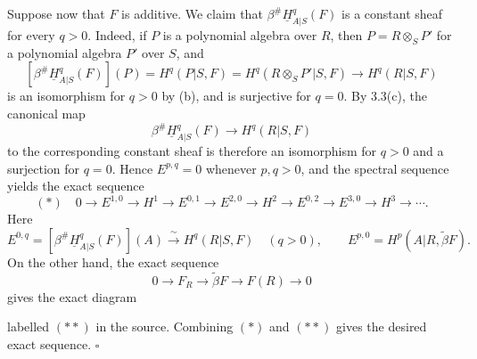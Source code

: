 Suppose now that $F$ is additive. We claim that
$\beta^{\#}\underline H^q_{A|S}(F)$ is a constant sheaf for every
$q>0$. Indeed, if $P$ is a polynomial algebra over $R$, then
$P=R\otimes_SP'$ for a polynomial algebra $P'$ over $S$, and
\[
 [\beta^{\#}\underline H^q_{A|S}(F)](P)
 =H^q(P|S,F)
 =H^q(R\otimes_SP'|S,F)
 \longrightarrow H^q(R|S,F)
\]
is an isomorphism for $q>0$ by (b), and is surjective for $q=0$.
By 3.3(c), the canonical map
\[
 \beta^{\#}\underline H^q_{A|S}(F)
 \longrightarrow H^q(R|S,F)
\]
to the corresponding constant sheaf is therefore an isomorphism
for $q>0$ and a surjection for $q=0$. Hence $E^{p,q}=0$ whenever
$p,q>0$, and the spectral sequence yields the exact sequence
\[
 (*)\quad
 0\longrightarrow E^{1,0}\longrightarrow H^1
 \longrightarrow E^{0,1}\longrightarrow E^{2,0}
 \longrightarrow H^2\longrightarrow E^{0,2}
 \longrightarrow E^{3,0}\longrightarrow H^3\longrightarrow\cdots.
\]
Here
\[
 E^{0,q}=[\beta^{\#}\underline H^q_{A|S}(F)](A)
 \xrightarrow{\ \sim\ }H^q(R|S,F)\quad(q>0),
 \qquad
 E^{p,0}=H^p(A|R,\widetilde\beta F).
\]
On the other hand, the exact sequence
\[
 0\longrightarrow F_R\longrightarrow\widetilde\beta F
 \longrightarrow F(R)\longrightarrow0
\]
gives the exact diagram
\begin{center}
\scriptsize
{}
\end{center}
labelled $(**)$ in the source. Combining $(*)$ and $(**)$ gives
the desired exact sequence. \hfill$\square$
